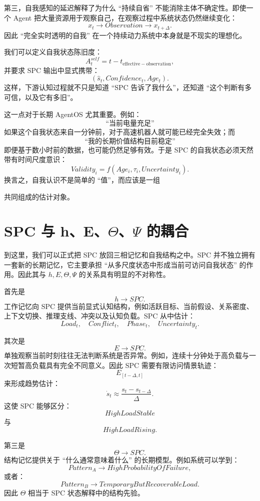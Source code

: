 第三，自我感知的延迟解释了为什么 ``持续自省'' 不能消除主体不确定性。即使一个 Agent 把大量资源用于观察自己，在观察过程中系统状态仍然继续变化：
\[
x_t
\rightarrow
Observation
\rightarrow
x_{t+\Delta}.
\]
因此 ``完全实时透明的自我'' 在一个持续动力系统中本身就是不现实的理想化。

我们可以定义自我状态陈旧度：
\[
A_t^{self}
=
t-t_{\mathrm{effective-observation}},
\]
并要求 SPC 输出中显式携带：
\[
(\hat{s}_t,
Confidence_t,
Age_t).
\]
这样，下游认知过程就不只是知道 ``SPC 告诉了我什么''，还知道 ``这个判断有多可信，以及它有多旧''。

这一点对于长期 AgentOS 尤其重要。例如：
\[
\text{``当前电量充足''}
\]
如果这个自我状态来自一分钟前，对于高速机器人就可能已经完全失效；而
\[
\text{``我的长期价值结构目前稳定''}
\]
即便基于数小时前的数据，也可能仍然足够有效。于是 SPC 的自我状态必须天然带有时间尺度意识：
\[
Validity_i
=
f(
Age_i,
\tau_i,
Uncertainty_i
).
\]
换言之，自我认识不是简单的 ``值''，而应该是一组
\begin{statementbox}
\centering
{}
\end{statementbox}
共同组成的估计对象。

\section{SPC 与 h、E、\texorpdfstring{$\Theta$}{Theta}、\texorpdfstring{$\Psi$}{Psi} 的耦合}

到这里，我们可以正式把 SPC 放回三相记忆和自我结构之中。SPC 并不独立拥有一套新的长期记忆，它主要承担 ``从多尺度状态中形成当前可访问自我状态'' 的作用。因此其与 $h,E,\Theta,\Psi$ 的关系具有明显的不对称性。

首先是
\[
h\rightarrow SPC.
\]
工作记忆向 SPC 提供当前显式认知结构，例如活跃目标、当前假设、关系密度、上下文切换、推理支线、冲突以及认知负载。SPC 从中估计：
\[
Load_t,\quad
Conflict_t,\quad
Phase_t,\quad
Uncertainty_t.
\]

其次是
\[
E\rightarrow SPC.
\]
单独观察当前时刻往往无法判断系统是否异常。例如，连续十分钟处于高负载与一次短暂高负载具有完全不同意义。因此 SPC 需要有限访问情景轨迹：
\[
E_{[t-\Delta,t]}
\]
来形成趋势估计：
\[
\dot{s}_t
\approx
\frac{s_t-s_{t-\Delta}}{\Delta}.
\]
这使 SPC 能够区分：
\[
HighLoadStable
\]
与
\[
HighLoadRising.
\]

第三是
\[
\Theta\rightarrow SPC.
\]
结构记忆提供关于 ``什么通常意味着什么'' 的长期模型。例如系统可以学到：
\[
Pattern_A
\rightarrow
HighProbabilityOfFailure,
\]
或者：
\[
Pattern_B
\rightarrow
TemporaryButRecoverableLoad.
\]
因此 $\Theta$ 相当于 SPC 状态解释中的结构先验。

